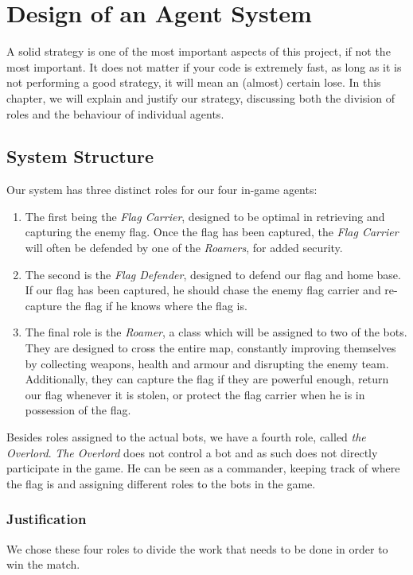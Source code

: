 \chapter{Design of an Agent System}

A solid strategy is one of the most important aspects of this project, if not the most important. It does not matter if your code is extremely fast, as long as it is not performing a good strategy, it will mean an (almost) certain lose. In this chapter, we will explain and justify our strategy, discussing both the division of roles and the behaviour of individual agents.

\section{System Structure}
Our system has three distinct roles for our four in-game agents:

\begin{enumerate}
\item The first being the \emph{Flag Carrier}, designed to be optimal in retrieving and capturing the enemy flag. Once the flag has been captured, the \emph{ Flag Carrier} will often be defended by one of the \emph{Roamers}, for added security.

\item The second is the \emph{Flag Defender}, designed to defend our flag and home base. If our flag has been captured, he should chase the enemy flag carrier and re-capture the flag if he knows where the flag is. 

\item The final role is the \emph{Roamer}, a class which will be assigned to two of the bots. They are designed to cross the entire map, constantly improving themselves by collecting weapons, health and armour and disrupting the enemy team. Additionally, they can capture the flag if they are powerful enough, return our flag whenever it is stolen, or protect the flag carrier when he is in possession of the flag.
\end{enumerate}

Besides roles assigned to the actual bots, we have a fourth role, called \emph{the Overlord}. \emph{The Overlord} does not control a bot and as such does not directly participate in the game. He can be seen as a commander, keeping track of where the flag is and assigning different roles to the bots in the game.

\subsection{Justification}
We chose these four roles to divide the work that needs to be done in order to win the match.

